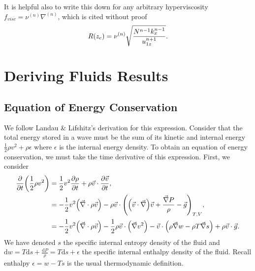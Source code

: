 \documentclass[11pt,
        usenames, %
        dvipsnames %
    ]{report}
\newcommand*{\pd}[2]{\frac{\partial#1}{\partial#2}}
\DeclarePairedDelimiter\p{\lparen}{\rparen}
\begin{document}
It is helpful also to write this down for any arbitrary hyperviscosity $f_{visc}
= \nu^{(n)} \nabla^{(n)}$, which is cited without proof
\begin{equation}
    R\p*{z_c} = \nu^{(n)} \sqrt{\frac{N^{n - 1}k_x^{n - 1}}{u_{1z}^{n + 1}}}.
\end{equation}

\clearpage

\appendix

\chapter{Deriving Fluids Results}

\section{Equation of Energy Conservation}

We follow Landau \& Lifshitz's derivation for this expression. Consider that the
total energy stored in a wave must be the sum of its kinetic and internal energy
$\frac{1}{2}\rho v^2 + \rho \epsilon$ where $\epsilon$ is the internal energy
density. To obtain an equation of energy conservation, we must take the time
derivative of this expression. First, we consider
\begin{align}
    \pd{}{t}\p*{\frac{1}{2}\rho v^2} &= \frac{1}{2}v^2\pd{\rho}{t}
        + \rho \vec{v} \cdot \pd{\vec{v}}{t},\nonumber\\
        &= -\frac{1}{2}v^2 \p*{\vec{\nabla} \cdot \rho \vec{v}}
            - \rho \vec{v} \cdot \p*{
                \p*{\vec{v} \cdot \vec{\nabla}}\vec{v} +
                    \frac{\vec{\nabla}P}{\rho} - \vec{g}
            }_{T, V},\nonumber\\
        &= -\frac{1}{2} v^2 \p*{\vec{\nabla} \cdot \rho \vec{v}}
            - \frac{1}{2}\rho \vec{v} \cdot \p*{\vec{\nabla} v^2}
            - \vec{v} \cdot \p*{
                \rho \vec{\nabla} w - \rho T \vec{\nabla}s
            } + \rho \vec{v} \cdot \vec{g}.
\end{align}
We have denoted $s$ the specific internal entropy density of the fluid and
$\mathrm{d}w = T\mathrm{d}s + \frac{\mathrm{d}P}{\rho} = T\mathrm{d}s +
\epsilon$ the specific internal enthalpy density of the fluid.
Recall enthalpy $\epsilon = w - Ts$ is the usual thermodynamic definition.
\end{document}
